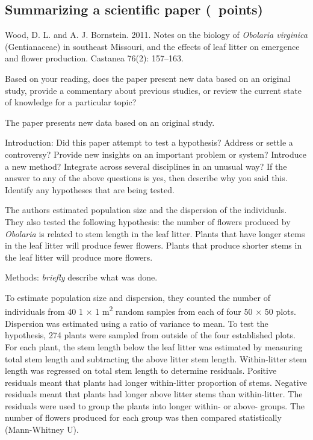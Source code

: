 \documentclass[12pt, hidelinks, addpoints]{exam}
\newcommand*\AnswerBox[2]{%
    \parbox[t][#1]{0.92\textwidth}{%
    \begin{solution}#2\end{solution}}
}
\newlength{\basespace}
\begin{document}
\subsection*{Summarizing a scientific paper (\numpoints~points)}

Wood, D. L. and A. J. Bornstein. 2011. Notes on the biology of \textit{Obolaria virginica} (Gentianaceae) in southeast Missouri, and the effects of leaf litter on emergence and flower production. Castanea 76(2): 157–163.

\begin{questions}

\question[1]
Based on your reading, does the paper present new data based on an original study, provide a commentary about previous studies, or review the current state of knowledge for a particular topic?

\AnswerBox{2\baselineskip}{The paper presents new data based on an original study.}

\question[1]
Introduction: Did this paper attempt to test a hypothesis? Address or settle a controversy?  Provide new insights on an important problem or system? Introduce a new method? Integrate across several disciplines in an unusual way? If the answer to any of the above questions is yes, then describe why you said this. Identify any hypotheses that are being tested. 

\AnswerBox{1.5\basespace}{%
The authors estimated population size and the dispersion of the individuals. They also tested the following hypothesis: the number of flowers produced by \textit{Obolaria} is related to stem length in the leaf litter. Plants that have longer stems in the leaf litter will produce fewer flowers. Plants that produce shorter stems in the leaf litter will produce more flowers. }

\question[1]
Methods: \emph{briefly} describe what was done. 

\AnswerBox{2\basespace}{%
To estimate population size and dispersion, they counted the number of individuals from 40 1 $\times$ 1 m\textsuperscript{2} random samples from each of four 50 $\times$ 50 plots. Dispersion was estimated using a ratio of variance to mean.  To test the hypothesis, 274 plants were sampled from outside of the four established plots. For each plant, the stem length below the leaf litter was estimated by measuring total stem length and subtracting the above litter stem length. Within-litter stem length was regressed on total stem length to determine residuals. Positive residuals meant that plants had longer within-litter proportion of stems. Negative residuals meant that plants had longer above litter stems than within-litter. The residuals were used to group the plants into longer within- or above- groups. The number of flowers produced for each group was then compared statistically (Mann-Whitney U).
}


\end{questions}
\end{document}
